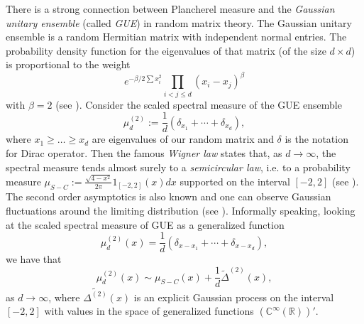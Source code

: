 \documentclass[11pt]{amsart}
\theoremstyle{plain}
\theoremstyle{remark}
\newcommand{\RR}{\mathbb{R}}
\newcommand{\C}{\mathbb{C}}
\begin{document}
There is a strong connection between Plancherel measure
and the \emph{Gaussian unitary ensemble} (called \emph{GUE}) in random matrix theory.
The Gaussian unitary ensemble is a random Hermitian matrix with independent normal entries.
The probability density function for the eigenvalues of that matrix (of the size $d \times d$) is proportional to the weight
\begin{equation}
\label{eq:BetaDensity}
e^{-\beta/2 \sum x_i^2} \prod_{i < j \leq d}(x_i-x_j)^\beta
\end{equation}
with $\beta = 2$ (see \cite{AndersonGuionnetZeitouni2010}).
Consider the scaled spectral measure of the GUE ensemble
\[ \mu^{(2)}_d := \frac{1}{d}\left(\delta_{x_1} + \cdots + \delta_{x_d}\right),\]
where $x_1 \geq \dots \geq x_d$ are eigenvalues of our random matrix
and $\delta$ is the notation for Dirac operator.
Then the famous \emph{Wigner law} states that, as $d \to \infty$, the spectral measure tends almost surely to a \emph{semicircular law}, i.e. to a probability measure $\mu_{S-C} := \frac{\sqrt{4-x^2}}{2\pi}1_{[-2,2]}(x)dx$ 
supported on the interval $[-2,2]$ (see \cite{AndersonGuionnetZeitouni2010}).
The second order asymptotics is also known and one can observe Gaussian fluctuations around the limiting distribution (see \cite{Johansson1998}).
Informally speaking, looking at the scaled spectral measure of GUE as a generalized function
\[ \mu^{(2)}_d(x) = \frac{1}{d}\left(\delta_{x-x_1} + \cdots + \delta_{x-x_d}\right),\]
we have that
\[ \mu^{(2)}_d(x) \sim \mu_{S-C}(x) + \frac{1}{d}\widetilde{\Delta}^{(2)}(x),\]
as $d \to \infty$, where $\tilde{\Delta^{(2)}}(x)$ is an explicit Gaussian process on the interval $[-2,2]$
with values in the space of generalized functions $(\C^\infty(\RR))'$.
\end{document}
